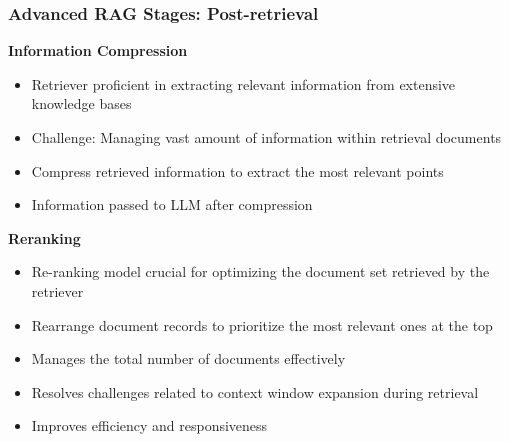 \begin{frame}[fragile]\frametitle{Advanced RAG Stages: Post-retrieval}
\textbf{Information Compression}
  \begin{itemize}
    \item Retriever proficient in extracting relevant information from extensive knowledge bases
    \item Challenge: Managing vast amount of information within retrieval documents
    \item Compress retrieved information to extract the most relevant points
    \item Information passed to LLM after compression
  \end{itemize}
\textbf{Reranking}
  \begin{itemize}
    \item Re-ranking model crucial for optimizing the document set retrieved by the retriever
    \item Rearrange document records to prioritize the most relevant ones at the top
    \item Manages the total number of documents effectively
    \item Resolves challenges related to context window expansion during retrieval
    \item Improves efficiency and responsiveness
  \end{itemize}
\end{frame}


